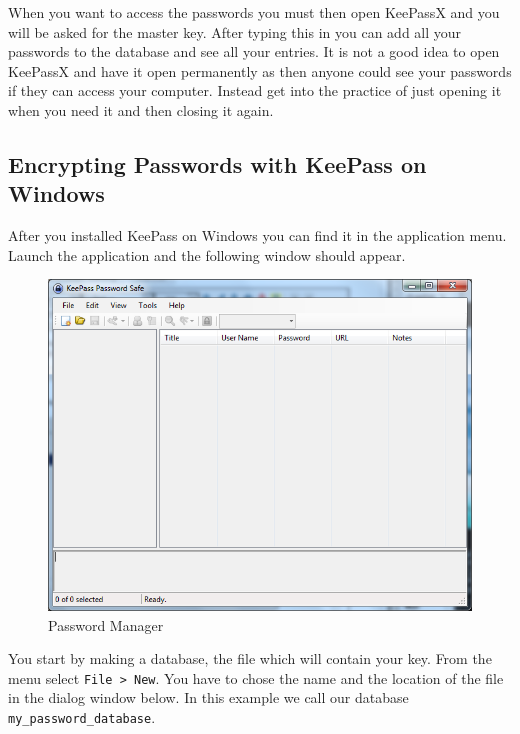 When you want to access the passwords you must then open KeePassX and
you will be asked for the master key. After typing this in you can add
all your passwords to the database and see all your entries. It is not a
good idea to open KeePassX and have it open permanently as then anyone
could see your passwords if they can access your computer. Instead get
into the practice of just opening it when you need it and then closing
it again.

\subsection{Encrypting Passwords with KeePass on Windows}

After you installed KeePass on Windows you can find it in the
application menu. Launch the application and the following window should
appear.

\begin{figure}[htbp]
\centering
\includegraphics{mng_8.png}
\caption{Password Manager}
\end{figure}

You start by making a database, the file which will contain your key.
From the menu select \verb!File > New!. You have to chose the name and
the location of the file in the dialog window below. In this example we
call our database \verb!my_password_database!.

